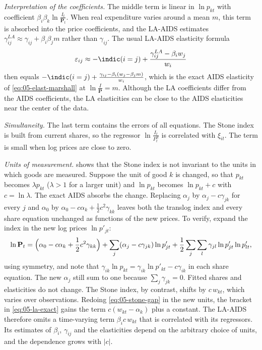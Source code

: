 \emph{Interpretation of the coefficients.} The middle term is linear in $\ln p_{kt}$ with coefficient
$\beta_i\beta_k\ln\frac{I_t}{\mathbf{P}_t}$. When real expenditure varies around a mean $m$, this term is
absorbed into the price coefficients, and the LA-AIDS estimates $\gamma_{ij}^{LA} \approx \gamma_{ij} +
\beta_i\beta_j m$ rather than $\gamma_{ij}$. The usual LA-AIDS elasticity formula
\begin{equation}\label{eq:05-la-elast}
  \varepsilon_{ij} \approx -\indic(i=j) + \frac{\gamma_{ij}^{LA} - \beta_i w_j}{w_i}
\end{equation}
then equals $-\indic(i=j) + \frac{\gamma_{ij} - \beta_i(w_j - \beta_j m)}{w_i}$, which is the exact AIDS
elasticity of \eqref{eq:05-elast-marshall} at $\ln\frac{I}{\mathbf{P}} = m$. Although the LA coefficients
differ from the AIDS coefficients, the LA elasticities can be close to the AIDS elasticities near the
center of the data.

\emph{Simultaneity.} The last term contains the errors of all equations. The Stone index is built from
current shares, so the regressor $\ln\frac{I_t}{P_t^S}$ is correlated with $\xi_{it}$. The term is small
when log prices are close to zero.

\emph{Units of measurement.} \citet{Moschini1995} shows that the Stone index is not invariant to the units
in which goods are measured. Suppose the unit of good $k$ is changed, so that $p_{kt}$ becomes
$\lambda p_{kt}$ ($\lambda > 1$ for a larger unit) and $\ln p_{kt}$ becomes $\ln p_{kt} + c$ with
$c = \ln\lambda$. The exact AIDS absorbs
the change. Replacing $\alpha_j$ by $\alpha_j - c\gamma_{jk}$ for every $j$ and $\alpha_0$ by $\alpha_0 -
c\alpha_k + \frac{1}{2}c^2\gamma_{kk}$ leaves both the translog index and every share equation unchanged
as functions of the new prices. To verify, expand the index in the new log prices $\ln p'_{jt}$:
\begin{equation*}
  \ln\mathbf{P}_t = \Bigl(\alpha_0 - c\alpha_k + \frac{1}{2}c^2\gamma_{kk}\Bigr)
  + \sum_j(\alpha_j - c\gamma_{jk})\ln p'_{jt} + \frac{1}{2}\sum_j\sum_l\gamma_{jl}\ln p'_{jt}\ln p'_{lt},
\end{equation*}
using symmetry, and note that $\gamma_{ik}\ln p_{kt} = \gamma_{ik}\ln p'_{kt} - c\gamma_{ik}$ in each share
equation. The new $\alpha_j$ still sum to one because $\sum_j\gamma_{jk} = 0$. Fitted shares and
elasticities do not change. The Stone index, by contrast, shifts by $c\,w_{kt}$, which varies over
observations. Redoing \eqref{eq:05-stone-gap} in the new units, the bracket in \eqref{eq:05-la-exact} gains
the term $c(w_{kt} - \alpha_k)$ plus a constant. The LA-AIDS therefore omits a time-varying term
$\beta_i c\, w_{kt}$ that is correlated with its regressors. Its estimates of $\beta_i$, $\gamma_{ij}$ and
the elasticities depend on the arbitrary choice of units, and the dependence grows with $|c|$.

